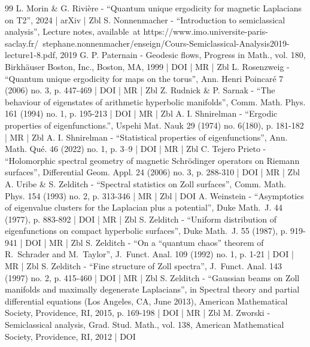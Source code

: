 \documentclass[10pt]{amsart}
\theoremstyle{plain}
\theoremstyle{definition}
\begin{document}
\begin{thebibliography}{99}
L. Morin \& G. Rivière - “Quantum unique ergodicity for magnetic Laplacians on T2”, 2024 | arXiv | Zbl
S. Nonnenmacher - “Introduction to semiclassical analysis”, Lecture notes, available at https://www.imo.universite-paris-saclay.fr/ stephane.nonnenmacher/enseign/Cours-Semiclassical-Analysis2019-lecture1-8.pdf, 2019
G. P. Paternain - Geodesic flows, Progress in Math., vol. 180, Birkhäuser Boston, Inc., Boston, MA, 1999 | DOI | MR | Zbl
L. Rosenzweig - “Quantum unique ergodicity for maps on the torus”, Ann. Henri Poincaré 7 (2006) no. 3, p. 447-469 | DOI | MR | Zbl
Z. Rudnick \& P. Sarnak - “The behaviour of eigenstates of arithmetic hyperbolic manifolds”, Comm. Math. Phys. 161 (1994) no. 1, p. 195-213 | DOI | MR | Zbl
A. I. Shnirelman - “Ergodic properties of eigenfunctions.”, Uspehi Mat. Nauk 29 (1974) no. 6(180), p. 181-182 | MR | Zbl
A. I. Shnirelman - “Statistical properties of eigenfunctions”, Ann. Math. Qué. 46 (2022) no. 1, p. 3–9 | DOI | MR | Zbl
C. Tejero Prieto - “Holomorphic spectral geometry of magnetic Schrödinger operators on Riemann surfaces”, Differential Geom. Appl. 24 (2006) no. 3, p. 288-310 | DOI | MR | Zbl
A. Uribe \& S. Zelditch - “Spectral statistics on Zoll surfaces”, Comm. Math. Phys. 154 (1993) no. 2, p. 313-346 | MR | Zbl | DOI
A. Weinstein - “Asymptotics of eigenvalue clusters for the Laplacian plus a potential”, Duke Math. J. 44 (1977), p. 883-892 | DOI | MR | Zbl
S. Zelditch - “Uniform distribution of eigenfunctions on compact hyperbolic surfaces”, Duke Math. J. 55 (1987), p. 919-941 | DOI | MR | Zbl
S. Zelditch - “On a “quantum chaos” theorem of R. Schrader and M. Taylor”, J. Funct. Anal. 109 (1992) no. 1, p. 1-21 | DOI | MR | Zbl
S. Zelditch - “Fine structure of Zoll spectra”, J. Funct. Anal. 143 (1997) no. 2, p. 415-460 | DOI | MR | Zbl
S. Zelditch - “Gaussian beams on Zoll manifolds and maximally degenerate Laplacians”, in Spectral theory and partial differential equations (Los Angeles, CA, June 2013), American Mathematical Society, Providence, RI, 2015, p. 169-198 | DOI | MR | Zbl
M. Zworski - Semiclassical analysis, Grad. Stud. Math., vol. 138, American Mathematical Society, Providence, RI, 2012 | DOI
\end{thebibliography}
\end{document}
